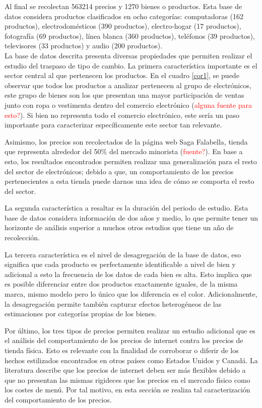 \documentclass[12pt,a4paper,pdflatex]{article}
\begin{document}
Al final se recolectan 563214 precios y 1270 bienes o productos. Esta base de datos considera productos clasificados en ocho categorías: computadoras (162 productos), electrodomésticos (390 productos), electro-hogar (17 productos), fotografía (69 productos), línea blanca (360 productos), teléfonos (39 productos), televisores (33 productos) y audio (200 productos). \\
La base de datos descrita presenta diversas propiedades que permiten realizar el estudio del traspaso de tipo de cambio. La primera característica importante es el sector central al que pertenecen los productos. En el cuadro \ref{cor1}, se puede observar que todos los productos a analizar pertenecen al grupo de electrónicos, este grupo de bienes son los que presentan una mayor participación de ventas junto con ropa o vestimenta dentro del comercio electrónico (\textcolor{red}{alguna fuente para esto?}). Si bien no representa todo el comercio electrónico, este sería un paso importante para caracterizar específicamente este sector tan relevante.

Asimismo, los precios son recolectados de la página web Saga Falabella, tienda que representa alrededor del 50\% del mercado minorista (\textcolor{red}{fuente?}). En base a esto, los resultados encontrados permiten realizar una generalización para el resto del sector de electrónicos; debido a que, un comportamiento de los precios pertenecientes a esta tienda puede darnos una idea de cómo se comporta el resto del sector.

La segunda característica a resaltar es la duración del periodo de estudio. Esta base de datos considera información de dos años y medio, lo que permite tener un horizonte de análisis superior a muchos otros estudios que tiene un año de recolección.

La tercera característica es el nivel de desagregación de la base de datos, eso significa que cada producto es perfectamente identificable a nivel de bien y adicional a esto la  frecuencia de los datos de cada bien es alta. Esto implica que es posible diferenciar entre dos productos exactamente iguales, de la misma marca, mismo modelo pero lo único que los diferencia es el color. Adicionalmente, la desagregación permite también capturar efectos heterogéneos de las estimaciones por categorías propias de los bienes.

Por último, los tres tipos de precios permiten realizar un estudio adicional que es el análisis del comportamiento de los precios de internet contra los precios de tienda física. Esto es relevante con la finalidad de corroborar o diferir de los hechos estilizados encontrados en otros países como Estados Unidos y Canadá. La literatura describe que los precios de internet deben ser más flexibles debido a que no presentan las mismas rigideces que los precios en el mercado físico como los costes de menú. Por tal motivo, en esta sección se realiza tal caracterización del comportamiento de los precios.
\end{document}
